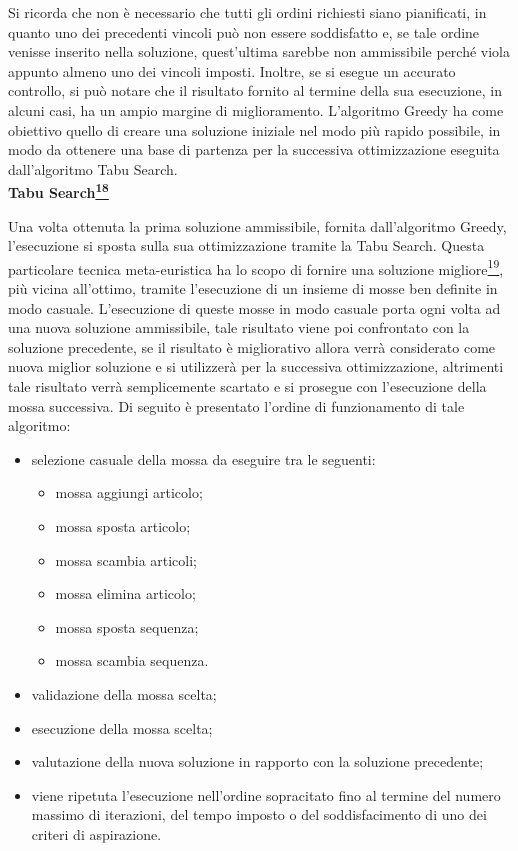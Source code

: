 Si ricorda che non è necessario che tutti gli ordini richiesti siano pianificati, in quanto uno dei precedenti vincoli può non essere soddisfatto e, se tale ordine venisse
inserito nella soluzione, quest'ultima sarebbe non ammissibile perché viola appunto almeno uno dei vincoli imposti. Inoltre, se si esegue un accurato controllo, si può notare che 
il risultato fornito al termine della sua esecuzione, in alcuni casi, ha un ampio margine di miglioramento. L'algoritmo Greedy ha come obiettivo quello di creare una
soluzione iniziale nel modo più rapido possibile, in modo da ottenere una base di partenza per la successiva ottimizzazione eseguita dall'algoritmo Tabu Search.\\


\textbf{Tabu Search\hyperref[tabu]{\textsuperscript{18}}}

Una volta ottenuta la prima soluzione ammissibile, fornita dall'algoritmo Greedy, l'esecuzione si sposta sulla sua ottimizzazione tramite la Tabu Search.
Questa particolare tecnica meta-euristica ha lo scopo di fornire una soluzione migliore\hyperref[scheduling]{\textsuperscript{19}}, più vicina all'ottimo, tramite l'esecuzione di un insieme di mosse ben
definite in modo casuale. L'esecuzione di queste mosse in modo casuale porta ogni volta ad una nuova soluzione ammissibile, tale risultato viene poi confrontato con la soluzione
precedente, se il risultato è migliorativo allora verrà considerato come nuova miglior soluzione e si utilizzerà per la successiva ottimizzazione, altrimenti tale risultato 
verrà semplicemente scartato e si prosegue con l'esecuzione della mossa successiva. Di seguito è presentato l'ordine di funzionamento di tale algoritmo:
\begin{itemize}
    \item selezione casuale della mossa da eseguire tra le seguenti:
    \begin{itemize}
        \item mossa aggiungi articolo;
        \item mossa sposta articolo;
        \item mossa scambia articoli;
        \item mossa elimina articolo;
        \item mossa sposta sequenza; 
        \item mossa scambia sequenza.  
    \end{itemize}
    \item validazione della mossa scelta;
    \item esecuzione della mossa scelta;
    \item valutazione della nuova soluzione in rapporto con la soluzione precedente;
    \item viene ripetuta l'esecuzione nell'ordine sopracitato fino al termine del numero massimo di iterazioni, del tempo imposto o del soddisfacimento di uno dei criteri di
    aspirazione.\\
\end{itemize}



